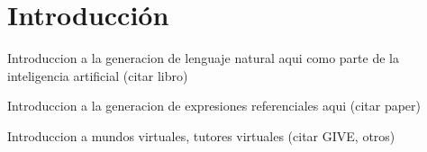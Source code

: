 \section{Introducci\'on}
\label{intro}

Introduccion a la generacion de lenguaje natural aqui como parte de la inteligencia artificial (citar libro)

Introduccion a la generacion de expresiones referenciales aqui (citar paper)

Introduccion a mundos virtuales, tutores virtuales (citar GIVE, otros)



